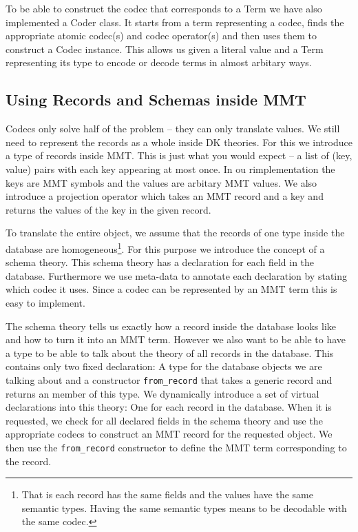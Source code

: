 \documentclass{deliverablereport}
\begin{document}
To be able to construct the codec that corresponds to a Term we have also implemented a Coder class. It starts from a term representing a codec, finds the appropriate atomic codec(s) and codec operator(s) and then uses them to construct a Codec instance. This allows us given a literal value  and a Term representing its type to encode or decode terms in almost arbitary ways.

\subsection{Using Records and Schemas inside MMT}

Codecs only solve half of the problem -- they can only translate values. We still need to represent the records as a whole inside DK theories. For this we introduce a type of records inside MMT. This is just what you would expect -- a list of (key, value) pairs with each key appearing at most once. In ou rimplementation the keys are MMT symbols and the values are arbitary MMT values. We also introduce a projection operator which takes an MMT record and a key and returns the values of the key in the given record.

To translate the entire object, we assume that the records of one type inside the database are homogeneous\footnote{That is each record has the same fields and the values have the same semantic types. Having the same semantic types means to be decodable with the same codec. }. For this purpose we introduce the concept of a schema theory. This schema theory has a declaration for each field in the database. Furthermore we use meta-data to annotate each declaration by stating which codec it uses. Since a codec can be represented by an MMT term this is easy to implement.

The schema theory tells us exactly how a record inside the database looks like and how to turn it into an MMT term. However we also want to be able to have a type to be able to talk about the theory of all records in the database. This contains only two fixed declaration: A type for the database objects we are talking about and a constructor \texttt{from\_record} that takes a generic record and returns an member of this type. We dynamically introduce a set of virtual declarations into this theory: One for each record in the database. When it is requested, we check for all declared fields in the schema theory and use the appropriate codecs to construct an MMT record for the requested object. We then use the  \texttt{from\_record} constructor to define the MMT term corresponding to the record.
\end{document}
